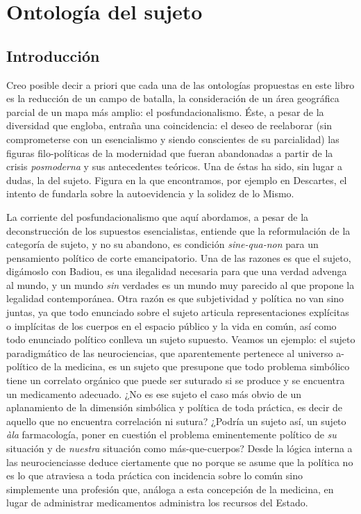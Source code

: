 \chapter{Ontología del sujeto}

\hl{}

\section{Introducción}

Creo posible decir a priori que cada una de las ontologías propuestas en
este libro es la reducción de un campo de batalla, la consideración de
un área geográfica parcial de un mapa más amplio: el posfundacionalismo.
Éste, a pesar de la diversidad que engloba, entraña una coincidencia: el
deseo de reelaborar (sin comprometerse con un esencialismo y siendo
conscientes de su parcialidad) las figuras filo-políticas de la
modernidad que fueran abandonadas a partir de la crisis
\emph{posmoderna} y sus antecedentes teóricos. Una de éstas ha sido, sin
lugar a dudas, la del sujeto. Figura en la que encontramos, por ejemplo
en Descartes, el intento de fundarla sobre la autoevidencia y la solidez
de lo Mismo.

La corriente del posfundacionalismo que aquí abordamos, a pesar de la
deconstrucción de los supuestos esencialistas, entiende que la
reformulación de la categoría de sujeto, y no su abandono, es condición
\emph{sine-qua-non} para un pensamiento político de corte emancipatorio.
Una de las razones es que el sujeto, digámoslo con Badiou, es una
ilegalidad necesaria para que una verdad advenga al mundo, y un mundo
\emph{sin} verdades es un mundo muy parecido al que propone la legalidad
contemporánea. Otra razón es que subjetividad y política no van sino
juntas, ya que todo enunciado sobre el sujeto articula representaciones
explícitas o implícitas de los cuerpos en el espacio público y la vida
en común, así como todo enunciado político conlleva un sujeto supuesto.
Veamos un ejemplo: el sujeto paradigmático de las neurociencias, que
aparentemente pertenece al universo a-político de la medicina, es un
sujeto que presupone que todo problema simbólico tiene un correlato
orgánico que puede ser suturado si se produce y se encuentra un
medicamento adecuado. ¿No es ese sujeto el caso más obvio de un
aplanamiento de la dimensión simbólica y política de toda práctica, es
decir de aquello que no encuentra correlación ni sutura? ¿Podría un
sujeto así, un sujeto \emph{àla} farmacología, poner en cuestión el
problema eminentemente político de \emph{su} situación y de
\emph{nuestra} situación como más-que-cuerpos? Desde la lógica interna a
las neurocienciasse deduce ciertamente que no porque se asume que la
política no es lo que atraviesa a toda práctica con incidencia sobre lo
común sino simplemente una profesión que, análoga a esta concepción de
la medicina, en lugar de administrar medicamentos administra los
recursos del Estado.


